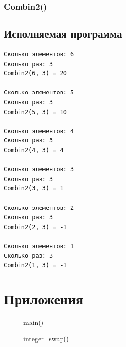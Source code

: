 \documentclass[12pt, a4paper]{article}
\begin{document}
\subsubsection{Combin2()}



\subsection{Исполняемая программа}

\begin{verbatim}
Сколько элементов: 6
Сколько раз: 3    
Combin2(6, 3) = 20

Сколько элементов: 5
Сколько раз: 3
Combin2(5, 3) = 10

Сколько элементов: 4
Сколько раз: 3
Combin2(4, 3) = 4

Сколько элементов: 3
Сколько раз: 3
Combin2(3, 3) = 1

Сколько элементов: 2
Сколько раз: 3
Combin2(2, 3) = -1

Сколько элементов: 1
Сколько раз: 3
Combin2(1, 3) = -1
\end{verbatim}

\labconclusion{}

\newpage

\section{Приложения}

\begin{figure}[h]
    \caption{main()}
    \label{fig:a_25_main}
\end{figure}

\begin{figure}[h]
    \caption{integer\_swap()}
    \label{fig:a_25_integer_swap}
\end{figure}
\end{document}
